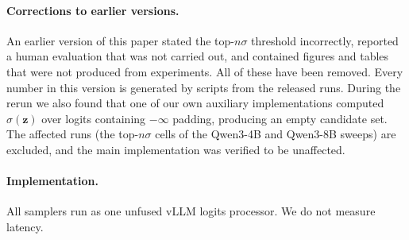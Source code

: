 \documentclass{article}
\begin{document}
\paragraph{Corrections to earlier versions.}
An earlier version of this paper stated the top-$n\sigma$ threshold incorrectly, reported a human evaluation that was not carried out, and contained figures and tables that were not produced from experiments. All of these have been removed. Every number in this version is generated by scripts from the released runs. During the rerun we also found that one of our own auxiliary implementations computed $\sigma(\mathbf{z})$ over logits containing $-\infty$ padding, producing an empty candidate set. The affected runs (the top-$n\sigma$ cells of the Qwen3-4B and Qwen3-8B sweeps) are excluded, and the main implementation was verified to be unaffected.

\paragraph{Implementation.}
All samplers run as one unfused vLLM logits processor. We do not measure latency.


\end{document}
